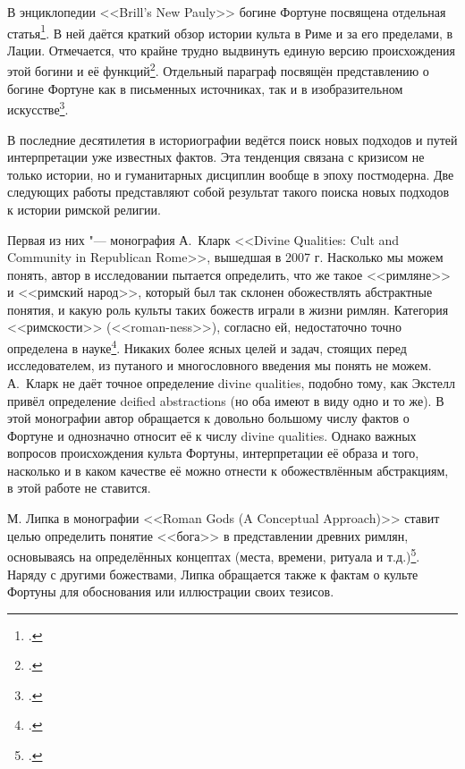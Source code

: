 
В энциклопедии <<Brill's New Pauly>> богине Фортуне посвящена отдельная статья\footcite[P. 505--509]{FortunaBrill2004}. В ней даётся краткий обзор истории культа в Риме и за его пределами, в Лации. Отмечается, что крайне трудно выдвинуть единую версию происхождения этой богини и её функций\footcite[P. 505]{FortunaBrill2004}. Отдельный параграф посвящён представлению о богине Фортуне как в письменных источниках, так и в изобразительном искусстве\footcite[P. 508]{FortunaBrill2004}.

В последние десятилетия в историографии ведётся поиск новых подходов и путей интерпретации уже известных фактов. Эта тенденция связана с кризисом не только истории, но и гуманитарных дисциплин вообще в эпоху постмодерна. Две следующих работы представляют собой результат такого поиска новых подходов к истории римской религии.


Первая из них "--- монография А.~Кларк <<Divine Qualities: Cult and Community in Republican Rome>>, вышедшая в 2007 г. Насколько мы можем понять, автор в исследовании пытается определить, что же такое <<римляне>> и <<римский народ>>, который был так склонен обожествлять абстрактные понятия, и какую роль культы таких божеств играли в жизни римлян. Категория <<римскости>> (<<roman-ness>>), согласно ей, недостаточно точно определена в науке\footcite[P. 5--6]{Clark2007}. Никаких более ясных целей и задач, стоящих перед исследователем, из путаного и многословного введения мы понять не можем. А.~Кларк не даёт точное определение divine qualities, подобно тому, как Экстелл привёл определение deified abstractions (но оба имеют в виду одно и то же). В этой монографии автор обращается к довольно большому числу фактов о Фортуне и однозначно относит её к числу divine qualities. Однако важных вопросов происхождения культа Фортуны, интерпретации её образа и того, насколько и в каком качестве её можно отнести к обожествлённым абстракциям, в этой работе не ставится.

М. Липка в монографии <<Roman Gods (A Conceptual Approach)>> ставит целью определить понятие <<бога>> в представлении древних римлян, основываясь на определённых концептах (места, времени, ритуала и т.д.)\footcite[P. 8]{Lipka2009}. Наряду с другими божествами, Липка обращается также к фактам о культе Фортуны для обоснования или иллюстрации своих тезисов.


